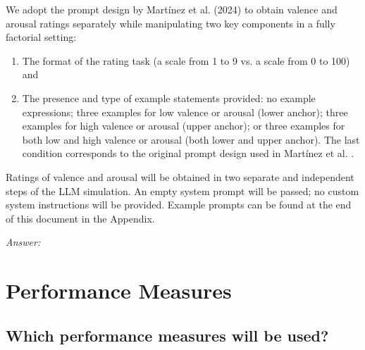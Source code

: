 \documentclass[12pt]{article}
\begin{document}
	\begin{examplebox}
		We adopt the prompt design by Martínez et al. (2024) to obtain valence and arousal ratings separately while manipulating two key components in a fully factorial setting:
		
		\begin{enumerate}
			\item The format of the rating task (a scale from 1 to 9 vs. a scale from 0 to 100) and 
			\item The presence and type of example statements provided: no example expressions; three examples for low valence or arousal (lower anchor); three examples for high valence or arousal (upper anchor); or three examples for both low and high valence or arousal (both lower and upper anchor). The last condition corresponds to the original prompt design used in Martínez et al. \parencite*{martinezUsingLargeLanguage2024}.
		\end{enumerate}
		
		Ratings of valence and arousal will be obtained in two separate and independent steps of the LLM simulation. An empty system prompt will be passed; no custom system instructions will be provided. Example prompts can be found at the end of this document in the Appendix.
		
	\end{examplebox} 
	
	\textit{Answer:}
	
	\section{Performance Measures}
	\subsection{Which performance measures will be used?}    
	
	
\end{document}
